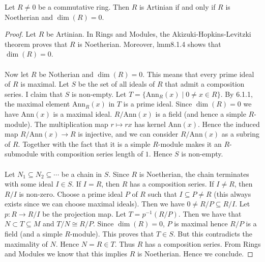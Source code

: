 \documentclass[a4paper]{article}
\begin{document}
\begin{prp}{}{} Let $R\neq 0$ be a commutative ring. Then $R$ is Artinian if and only if $R$ is Noetherian and $\dim(R)=0$. 
\begin{proof}
Let $R$ be Artinian. In Rings and Modules, the Akizuki-Hopkins-Levitzki theorem proves that $R$ is Noetherian. Moreover, lmm8.1.4 shows that $\dim(R)=0$. \\~\\

Now let $R$ be Notherian and $\dim(R)=0$. This means that every prime ideal of $R$ is maximal. Let $S$ be the set of all ideals of $R$ that admit a composition series. I claim that $S$ is non-empty. Let $T=\{\text{Ann}_R(x)\;|\;0\neq x\in R\}$. By 6.1.1, the maximal element $\text{Ann}_R(x)$ in $T$ is a prime ideal. Since $\dim(R)=0$ we have $\text{Ann}(x)$ is a maximal ideal. $R/\text{Ann}(x)$ is a field (and hence a simple $R$-module). The multiplication map $r\mapsto rx$ has kernel $\text{Ann}(x)$. Hence the induced map $R/\text{Ann}(x)\to R$ is injective, and we can consider $R/\text{Ann}(x)$ as a subring of $R$. Together with the fact that it is a simple $R$-module makes it an $R$-submodule with composition series length of $1$. Hence $S$ is non-empty. \\~\\

Let $N_1\subseteq N_2\subseteq\cdots$ be a chain in $S$. Since $R$ is Noetherian, the chain terminates with some ideal $I\in S$. If $I=R$, then $R$ has a composition series. If $I\neq R$, then $R/I$ is non-zero. Choose a prime ideal $P$ of $R$ such that $I\subseteq P\neq R$ (this always exists since we can choose maximal ideals). Then we have $0\neq R/P\subseteq R/I$. Let $p:R\to R/I$ be the projection map. Let $T=p^{-1}(R/P)$. Then we have that $N\subset T\subseteq M$ and $T/N\cong R/P$. Since $\dim(R)=0$, $P$ is maximal hence $R/P$ is a field (and a simple $R$-module). This proves that $T\in S$. But this contradicts the maximality of $N$. Hence $N=R\in T$. Thus $R$ has a composition series. From Rings and Modules we know that this implies $R$ is Noetherian. Hence we conclude. 
\end{proof}
\end{prp}
\end{document}
